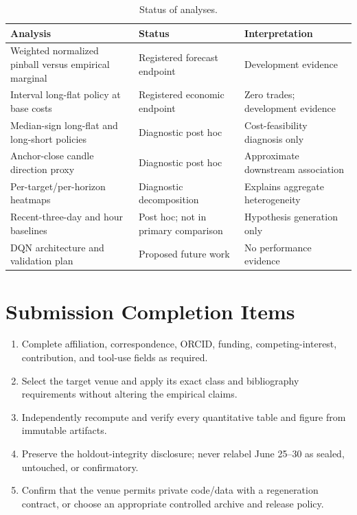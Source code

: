 \documentclass[10pt,letterpaper]{article}
\numberwithin{equation}{section}
\theoremstyle{definition}
\theoremstyle{remark}
\begin{document}
\begin{table}[H]
\centering
\small
\begin{tabularx}{\textwidth}{@{}Y p{3.8cm}Y@{}}
\toprule
\textbf{Analysis} & \textbf{Status} & \textbf{Interpretation}\\
\midrule
Weighted normalized pinball versus empirical marginal &
Registered forecast endpoint & Development evidence\\
Interval long-flat policy at base costs &
Registered economic endpoint & Zero trades; development evidence\\
Median-sign long-flat and long-short policies &
Diagnostic post hoc & Cost-feasibility diagnosis only\\
Anchor-close candle direction proxy &
Diagnostic post hoc & Approximate downstream association\\
Per-target/per-horizon heatmaps &
Diagnostic decomposition & Explains aggregate heterogeneity\\
Recent-three-day and hour baselines &
Post hoc; not in primary comparison & Hypothesis generation only\\
DQN architecture and validation plan &
Proposed future work & No performance evidence\\
\bottomrule
\end{tabularx}
\caption{Status of analyses.}
\label{tab:analysis-status}
\end{table}

\section{Submission Completion Items}

\begin{enumerate}
  \item Complete affiliation, correspondence, ORCID, funding,
  competing-interest, contribution, and tool-use fields as required.
  \item Select the target venue and apply its exact class and bibliography
  requirements without altering the empirical claims.
  \item Independently recompute and verify every quantitative table and figure
  from immutable artifacts.
  \item Preserve the holdout-integrity disclosure; never relabel June 25--30 as
  sealed, untouched, or confirmatory.
  \item Confirm that the venue permits private code/data with a regeneration
  contract, or choose an appropriate controlled archive and release policy.
\end{enumerate}
\end{document}
